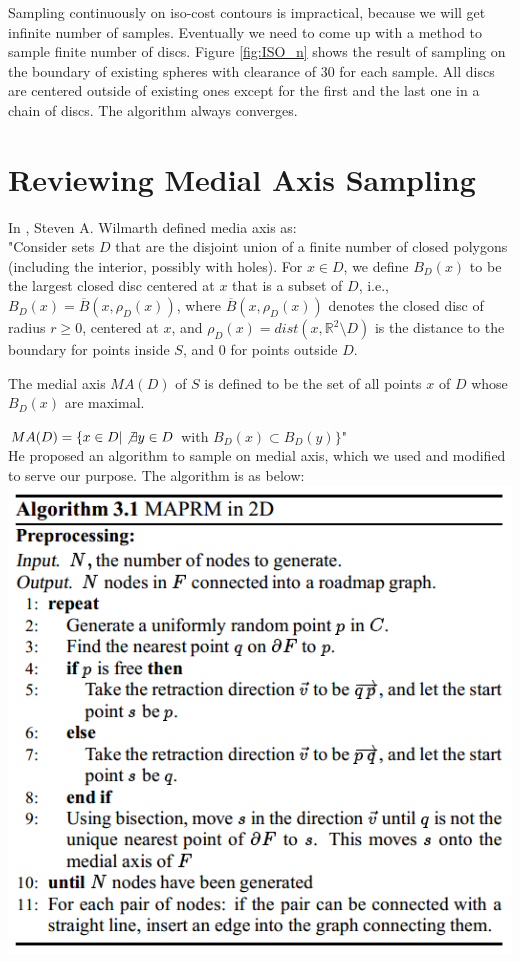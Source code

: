 \documentclass[12pt]{article}
\begin{document}
  Sampling continuously on iso-cost contours is impractical, because we will get infinite number of samples. Eventually we need to come up with a method to sample finite number of discs. Figure \ref{fig:ISO_n} shows the result of sampling on the boundary of existing spheres with clearance of 30 for each sample. All discs are centered outside of existing ones except for the first and the last one in a chain of discs. The algorithm always converges.\\
   
  \section{Reviewing Medial Axis Sampling}
   
  In \cite{steven}, Steven A. Wilmarth defined media axis as: \\
   
  "Consider sets $D$ that are the disjoint union of a finite number of closed polygons (including the interior, possibly with holes). For $x\in D$, we define $B_D(x)$ to be the largest closed disc centered at $x$ that is a subset of $D$, i.e., $B_D(x) = \overline{B}( x, \rho_{D}(x) )$, where $\overline{B}( x, \rho_{D}(x) )$ denotes the closed disc of radius $r \geq 0$, centered at $x$, and $\rho_{D}(x) = dist(x, \mathbb{R}^2 \setminus D)$ is the distance to the boundary for points inside $S$, and 0 for points outside $D$.
  
  The medial axis $MA(D)$ of $S$ is defined to be the set of all points $x$ of $D$ whose $B_D(x)$ are maximal.
  
  $MA(D) = \{ x \in D | \not \exists y \in D$ with $B_D(x) \subset B_D(y) \}$"\\
  
  He proposed an algorithm to sample on medial axis, which we used and modified to serve our purpose. The algorithm is as below:\\
   
  \includegraphics[scale=0.65]{MAPRM.png}
\end{document}
